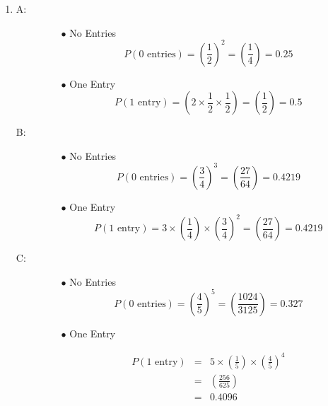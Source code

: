 \documentclass[a4paper,12pt]{article}
\begin{document}
\begin{enumerate}
\item 
\begin{description}

\item[A:]  
\begin{itemize}
\item[$\bullet$] No Entries
\[ P( 0 \mbox{ entries}) = \left(\frac{1}{2}\right)^2  = \left(\frac{1}{4}\right) = 0.25\]
\item[$\bullet$] One Entry
\[ P( 1 \mbox{ entry}) = \left( 2 \times \frac{1}{2} \times \frac{1}{2}\right)  = \left(\frac{1}{2}\right) = 0.5\]
\end{itemize}

\item[B:]
\begin{itemize}
\item[$\bullet$] No Entries
\[ P( 0 \mbox{ entries}) = \left(\frac{3}{4}\right)^3  = \left(\frac{27}{64}\right) = 0.4219\]
\item[$\bullet$] One Entry
\[ P( 1 \mbox{ entry}) =  3 \times \left( \frac{1}{4}\right) \times \left( \frac{3}{4}\right)^2  = \left(\frac{27}{64}\right) = 0.4219\]
\end{itemize}

\item[C:]
\begin{itemize}
\item[$\bullet$] No Entries
\[ P( 0 \mbox{ entries}) = \left(\frac{4}{5}\right)^5  = \left(\frac{1024}{3125}\right) = 0.327\]
\item[$\bullet$] One Entry

\begin{eqnarray*} 
P( 1 \mbox{ entry}) &=&  
5 \times \left( \frac{1}{5} \right) \times \left( \frac{4}{5}\right)^4 \\ &=& \left(\frac{256}{625}\right) \\ &=& 
0.4096
\end{eqnarray*}
\end{itemize}
\end{description}


\begin{table}[ht!]
     
\centering
     
\begin{tabular}{|p{15cm}|}
     
\hline        


\end{tabular}
\end{table}
\end{enumerate}
\end{document}
